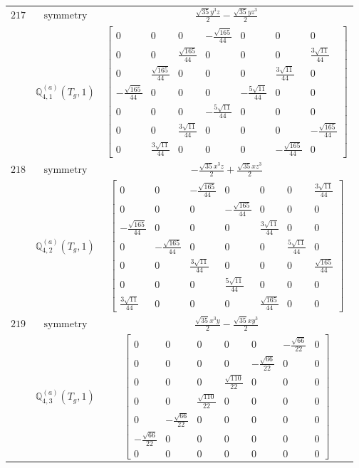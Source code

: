 \documentclass[fleqn,8pt,landscape]{jsarticle}
\begin{document}
\begin{longtable}{ccc}
$ 217 $ & $ \text{symmetry} $ & $ \frac{\sqrt{35} y^{3} z}{2} - \frac{\sqrt{35} y z^{3}}{2} $ \\
$  $ & $ \mathbb{Q}_{4,1}^{(a)}(T_{g},1) $ & $ \begin{bmatrix} 0 & 0 & 0 & - \frac{\sqrt{165}}{44} & 0 & 0 & 0 \\ 0 & 0 & \frac{\sqrt{165}}{44} & 0 & 0 & 0 & \frac{3 \sqrt{11}}{44} \\ 0 & \frac{\sqrt{165}}{44} & 0 & 0 & 0 & \frac{3 \sqrt{11}}{44} & 0 \\ - \frac{\sqrt{165}}{44} & 0 & 0 & 0 & - \frac{5 \sqrt{11}}{44} & 0 & 0 \\ 0 & 0 & 0 & - \frac{5 \sqrt{11}}{44} & 0 & 0 & 0 \\ 0 & 0 & \frac{3 \sqrt{11}}{44} & 0 & 0 & 0 & - \frac{\sqrt{165}}{44} \\ 0 & \frac{3 \sqrt{11}}{44} & 0 & 0 & 0 & - \frac{\sqrt{165}}{44} & 0 \end{bmatrix} $ \\ \hline
$ 218 $ & $ \text{symmetry} $ & $ - \frac{\sqrt{35} x^{3} z}{2} + \frac{\sqrt{35} x z^{3}}{2} $ \\
$  $ & $ \mathbb{Q}_{4,2}^{(a)}(T_{g},1) $ & $ \begin{bmatrix} 0 & 0 & - \frac{\sqrt{165}}{44} & 0 & 0 & 0 & \frac{3 \sqrt{11}}{44} \\ 0 & 0 & 0 & - \frac{\sqrt{165}}{44} & 0 & 0 & 0 \\ - \frac{\sqrt{165}}{44} & 0 & 0 & 0 & \frac{3 \sqrt{11}}{44} & 0 & 0 \\ 0 & - \frac{\sqrt{165}}{44} & 0 & 0 & 0 & \frac{5 \sqrt{11}}{44} & 0 \\ 0 & 0 & \frac{3 \sqrt{11}}{44} & 0 & 0 & 0 & \frac{\sqrt{165}}{44} \\ 0 & 0 & 0 & \frac{5 \sqrt{11}}{44} & 0 & 0 & 0 \\ \frac{3 \sqrt{11}}{44} & 0 & 0 & 0 & \frac{\sqrt{165}}{44} & 0 & 0 \end{bmatrix} $ \\ \hline
$ 219 $ & $ \text{symmetry} $ & $ \frac{\sqrt{35} x^{3} y}{2} - \frac{\sqrt{35} x y^{3}}{2} $ \\
$  $ & $ \mathbb{Q}_{4,3}^{(a)}(T_{g},1) $ & $ \begin{bmatrix} 0 & 0 & 0 & 0 & 0 & - \frac{\sqrt{66}}{22} & 0 \\ 0 & 0 & 0 & 0 & - \frac{\sqrt{66}}{22} & 0 & 0 \\ 0 & 0 & 0 & \frac{\sqrt{110}}{22} & 0 & 0 & 0 \\ 0 & 0 & \frac{\sqrt{110}}{22} & 0 & 0 & 0 & 0 \\ 0 & - \frac{\sqrt{66}}{22} & 0 & 0 & 0 & 0 & 0 \\ - \frac{\sqrt{66}}{22} & 0 & 0 & 0 & 0 & 0 & 0 \\ 0 & 0 & 0 & 0 & 0 & 0 & 0 \end{bmatrix} $ \\ \hline

\end{longtable}
\end{document}
